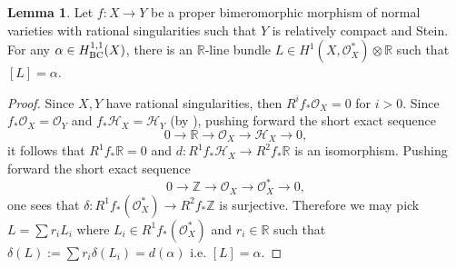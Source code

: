 \documentclass[11pt]{amsart}
\numberwithin{equation}{section}
\def\OO{\mathcal O}
\newcommand\R{{\mathbb{R}}}
\theoremstyle{definition}
\theoremstyle{definition}
\newtheorem{lemma}[theorem]{Lemma}
\theoremstyle{definition}
\begin{document}
\begin{lemma}\label{l-rel} Let $f:X\to Y$ be a proper bimeromorphic morphism of normal varieties  with rational singularities such that $Y$ is relatively compact and Stein. For any $\alpha\in H^{1,1}_{\rm BC}(X)$, there is an $\R$-line bundle $L\in H^1(X,\OO _X^*)\otimes \R$ such that $[L]=\alpha$.  
\end{lemma}
\begin{proof} Since $X,Y$ have rational singularities, then $R^if_*\OO _X=0$ for $i>0$.
Since $f_*\OO _X=\OO _Y$ and $f_*\mathcal H _X=\mathcal H_Y$ (by \cite[Lemma 2.5]{DH24}), pushing forward the short exact sequence \[0\to \R\to \OO _X\to \mathcal H _X\to 0,\]it follows that $R^1f_*\R=0$ and $d:R^1f_*\mathcal H _X\to R^2f_*\R$ is an isomorphism. 
Pushing forward the short exact sequence
\[0\to \mathbb Z\to \OO _X\to \OO ^*_X\to 0,\] one sees that $\delta: R^1f_*(\OO_X^*)\to R^2f_*\mathbb Z$ is surjective.
Therefore we may pick $L=\sum r_iL_i$ where $L_i \in R^1f_*(\OO_X^*)$ and $r_i\in \R$ such that $\delta (L):=\sum r_i\delta(L_i)=d(\alpha)$ i.e. $[L]=\alpha$.
\end{proof}
\end{document}
